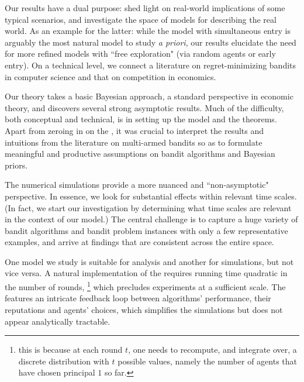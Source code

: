 Our results have a dual purpose: shed light on real-world implications of some typical scenarios, and investigate the space of models for describing the real world. As an example for the latter: while the \HardMax model with simultaneous entry is arguably the most natural model to study \emph{a priori}, our results elucidate the need for more refined models with ``free exploration" (\eg via random agents or early entry). On a technical level, we connect a literature on regret-minimizing bandits in computer science and that on competition in economics.

Our theory takes a basic Bayesian approach, a standard perspective in economic theory, and discovers several strong asymptotic results. Much of the difficulty, both conceptual and technical, is in setting up the model and the theorems. Apart from zeroing in on the \TheoryModel, it was crucial to interpret the results and intuitions from the literature on multi-armed bandits so as to formulate meaningful and productive assumptions on bandit algorithms and Bayesian priors.

The numerical simulations provide a more nuanced and ``non-asymptotic" perspective. In essence, we look for substantial effects within relevant time scales. (In fact, we start our investigation by determining what time scales are relevant in the context of our model.) The central challenge is to capture a huge variety of bandit algorithms and bandit problem instances with only a few representative examples, and arrive at findings that are consistent across the entire space.

One model we study is suitable for analysis and another for simulations, but not vice versa. A natural implementation of the \TheoryModel requires running time quadratic in the number of rounds,%
\footnote{\label{fn:Tsquared}\Eg this is because at each round $t$, one needs to recompute, and integrate over, a discrete distribution with $t$ possible values, namely the number of agents that have chosen principal $1$ so far.}
which precludes experiments at a sufficient scale. The \ExptsModel features an intricate feedback loop between algorithms' performance, their reputations and agents' choices, which simplifies the simulations but does not appear analytically tractable.



